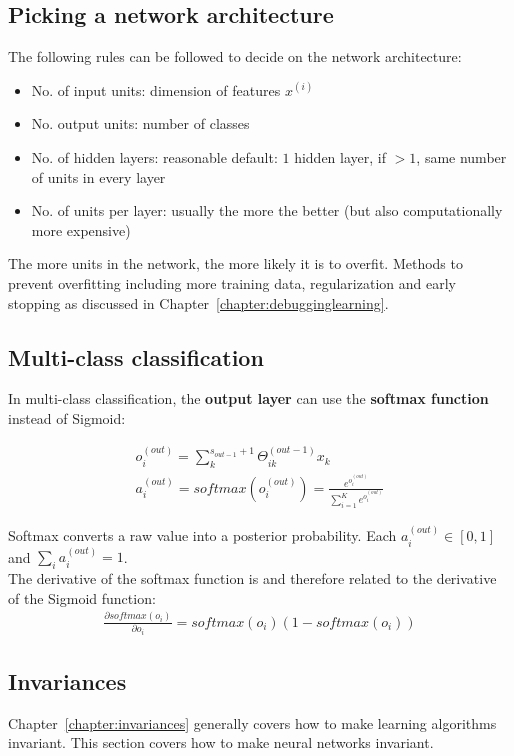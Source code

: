 \documentclass{report}
\begin{document}
\subsection{Picking a network architecture}
The following rules can be followed to decide on the network architecture:
\begin{itemize}
\item No. of input units: dimension of features $x^{(i)}$
\item No. output units: number of classes
\item No. of hidden layers: reasonable default: $1$ hidden layer, if $>1$, same number of units in every layer
\item No. of units per layer: usually the more the better (but also computationally more expensive)
\end{itemize}
The more units in the network, the more likely it is to overfit.
Methods to prevent overfitting including more training data, regularization and early stopping as discussed in Chapter~\ref{chapter:debugginglearning}.


\subsection{Multi-class classification}
In multi-class classification, the {\bf output layer} can use the {\bf softmax function} instead of Sigmoid:

\begin{align*}
o_i^{(out)} = \sum_k^{s_{out-1}+1} \Theta_{ik}^{(out-1)}x_k \\
a_i^{(out)} = softmax(o_i^{(out)}) = \frac{e^{o_i^{(out)}}}{\sum_{i=1}^{K} e^{o_i^{(out)}}}
\end{align*}

Softmax converts a raw value into a posterior probability.
Each $a_i^{(out)} \in [0,1]$ and $\sum_i a_i^{(out)} = 1$.\\
The derivative of the softmax function is and therefore related to the derivative of the Sigmoid function:
\begin{align*}
\frac{\partial softmax(o_i)}{\partial o_i} = softmax(o_i)(1-softmax(o_i))
\end{align*}

\subsection{Invariances}
\label{chapter:nninvariances}
Chapter~\ref{chapter:invariances} generally covers how to make learning algorithms invariant. This section covers how to make neural networks invariant.
\\
\end{document}

